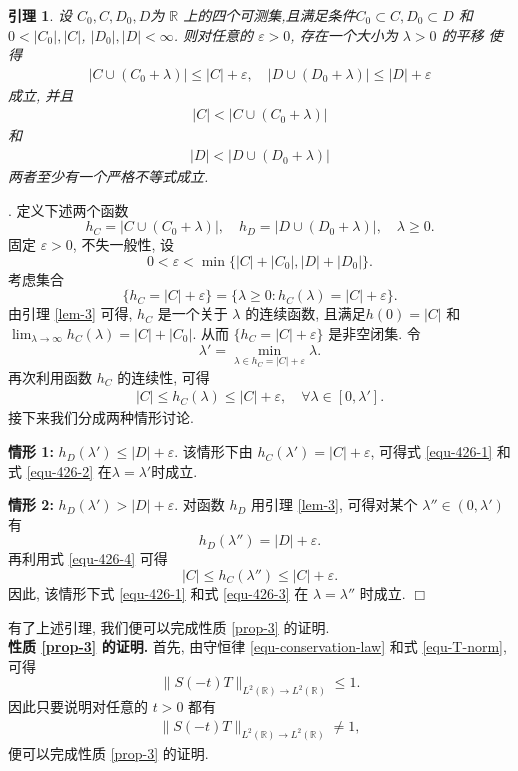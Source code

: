 \documentclass[master]{cugthesis}
\newcommand\R{\ensuremath{\mathbb{R}}}
\newenvironment{proof}{{\noindent\itshape 证明}.}{\hfill $\Box$\par}
\newtheorem{lemma}{引理}[chapter]
\begin{document}
\begin{lemma}\label{lem-4}
设 $C_0,C,D_0,D$为 $\R$ 上的四个可测集,且满足条件$C_0\subset C, D_0\subset D$ 和 $0<|C_0|, |C|$, $|D_0|, |D|<\infty$. 则对任意的 $\varepsilon>0$, 存在一个大小为 $\lambda>0$ 的平移 使得
\begin{align}\label{equ-426-1}
   |C\cup (C_0+\lambda)|\leq|C|+\varepsilon, \quad    |D\cup (D_0+\lambda)|\leq|D|+\varepsilon
\end{align}
成立, 并且
\begin{align}\label{equ-426-2}
  |C|<|C\cup (C_0+\lambda)|
\end{align}
和
\begin{align}\label{equ-426-3}
 |D|< |D\cup (D_0+\lambda)|
\end{align}
两者至少有一个严格不等式成立.
\end{lemma}
\begin{proof}
定义下述两个函数
$$
h_C=|C\cup (C_0+\lambda)|, \quad h_D=|D\cup (D_0+\lambda)|, \quad \lambda\geq 0.
$$
固定 $\varepsilon>0$, 不失一般性, 设 
$$0<\varepsilon<\min \lbrace|C|+|C_0|, |D|+|D_0|\rbrace.$$ 考虑集合
$$
\{h_C=|C|+\varepsilon\}=\{\lambda\geq 0: h_C(\lambda)=|C|+\varepsilon\}.
$$
由引理 \ref{lem-3} 可得, $h_C$ 是一个关于 $\lambda$ 的连续函数, 且满足$h(0)=|C|$ 和 $\lim_{\lambda\to \infty}\limits h_C(\lambda)=|C|+|C_0|$. 从而 $\{h_C=|C|+\varepsilon\}$ 是非空闭集. 令
$$
\lambda'=\min_{\lambda\in h_C=|C|+\varepsilon} \lambda.
$$
再次利用函数 $h_C$ 的连续性, 可得
\begin{align}\label{equ-426-4}
|C|\leq h_C(\lambda)\leq|C|+\varepsilon, \quad \forall \lambda\in[0,\lambda'].
\end{align}
接下来我们分成两种情形讨论.

{\bf 情形 1:} $h_D(\lambda')\leq |D|+\varepsilon$. 该情形下由 $h_C(\lambda')=|C|+\varepsilon$, 可得式 \eqref{equ-426-1} 和式 \eqref{equ-426-2} 在$\lambda=\lambda'$时成立.

{\bf 情形 2:} $h_D(\lambda')>|D|+\varepsilon$. 对函数 $h_D$ 用引理 \ref{lem-3}, 可得对某个 $\lambda''\in(0,\lambda')$ 有
$$
 h_D(\lambda'')=|D|+\varepsilon.
$$
 再利用式 \eqref{equ-426-4} 可得
$$
|C|\leq h_C(\lambda'')\leq|C|+\varepsilon.
$$
因此, 该情形下式 \eqref{equ-426-1} 和式 \eqref{equ-426-3} 在 $\lambda=\lambda''$ 时成立.
\end{proof}

有了上述引理, 我们便可以完成性质 \ref{prop-3} 的证明.\\
{\bf {性质 \ref{prop-3} 的证明}.} 
首先, 由守恒律 \eqref{equ-conservation-law} 和式 \eqref{equ-T-norm}, 可得
$$
\|S(-t)T\|_{L^2(\R)\to L^2(\R)}\leq 1.
$$
因此只要说明对任意的 $t>0$ 都有
\begin{align}\label{equ-4-23-1}
\|S(-t)T\|_{L^2(\R)\to L^2(\R)}\neq 1,
\end{align}
便可以完成性质 \ref{prop-3} 的证明.
\end{document}
